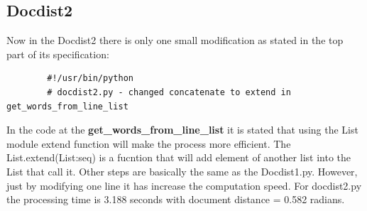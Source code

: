 \documentclass{article}
\begin{document}
    \subsection{Docdist2}
    Now in the Docdist2 there is only one small modification as stated in the top part of its specification:
    \begin{lstlisting}
        #!/usr/bin/python
        # docdist2.py - changed concatenate to extend in get_words_from_line_list
    \end{lstlisting}
    In the code at the \textbf{get\_words\_from\_line\_list} it is stated that using the List module extend function will make the process more efficient. 
    The List.extend(List:seq) is a fucntion that will add element of another list into the List that call it. 
    Other steps are basically the same as the Docdist1.py.
    However, just by modifying one line it has increase the computation speed.
    For docdist2.py the processing time is 3.188 seconds with document distance = 0.582 radians.
\end{document}
